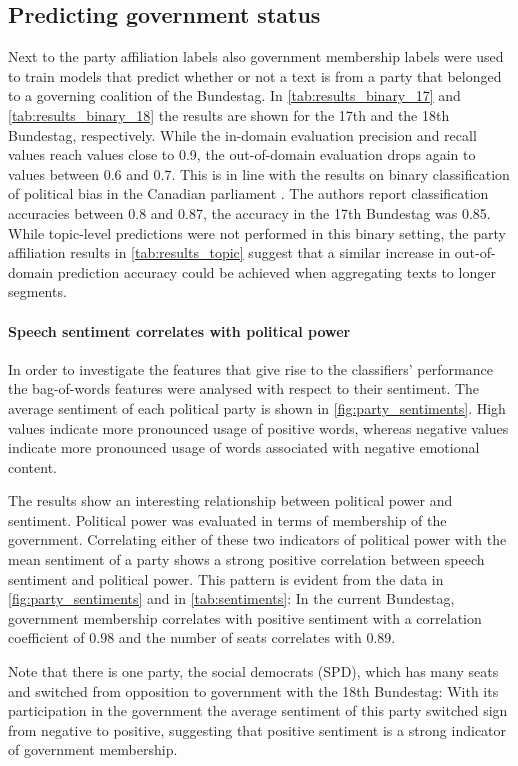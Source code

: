 \documentclass{article}
\begin{document}
\subsection{Predicting government status}\label{sec:sentiment_result}
Next to the party affiliation labels also government membership labels were used to train models that predict whether or not a text is from a party that belonged to a governing coalition of the Bundestag. In \autoref{tab:results_binary_17} and \autoref{tab:results_binary_18} the results are shown for the 17th and the 18th Bundestag, respectively. While the in-domain evaluation precision and recall values reach values close to 0.9, the out-of-domain evaluation drops again to values between 0.6 and 0.7. This is in line with the results on binary classification of political bias in the Canadian parliament \cite{Yu2008}. The authors report classification accuracies between 0.8 and 0.87, the accuracy in the 17th Bundestag was 0.85. While topic-level predictions were not performed in this binary setting, the party affiliation results in \autoref{tab:results_topic} suggest that a similar increase in out-of-domain prediction accuracy could be achieved when aggregating texts to longer segments.
\paragraph{Speech sentiment correlates with political power} In order to investigate the features that give rise to the classifiers' performance the bag-of-words features were analysed with respect to their sentiment. The average sentiment of each political party is shown in \autoref{fig:party_sentiments}. High values indicate more pronounced usage of positive words, whereas negative values indicate more pronounced usage of words associated with negative emotional content.

The results show an interesting relationship between political power and sentiment. Political power was evaluated in terms of membership of the government. Correlating either of these two indicators of political power with the mean sentiment of a party shows a strong positive correlation between speech sentiment and political power. This pattern is evident from the data in \autoref{fig:party_sentiments} and in \autoref{tab:sentiments}: In the current Bundestag, government membership correlates with positive sentiment with a correlation coefficient of 0.98 and the number of seats correlates with 0.89.

Note that there is one party, the social democrats (SPD), which has many seats and switched from opposition to government with the 18th Bundestag: With its participation in the government the average sentiment of this party switched sign from negative to positive, suggesting that positive sentiment is a strong indicator of government membership.
\end{document}
